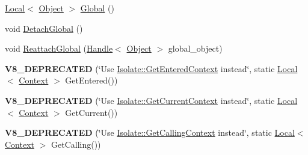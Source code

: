 \begin{DoxyCompactItemize}
\item 
\hyperlink{classv8_1_1_local}{Local}$<$ \hyperlink{classv8_1_1_object}{Object} $>$ \hyperlink{classv8_1_1_context_af5cd9f97ef6a3307c1c21f80f4b743eb}{Global} ()
\item 
void \hyperlink{classv8_1_1_context_a841c7dd92eb8c57df92a268a164dea97}{Detach\+Global} ()
\item 
void \hyperlink{classv8_1_1_context_a1db9a514d7bb1c055a26359727bd2f6b}{Reattach\+Global} (\hyperlink{classv8_1_1_handle}{Handle}$<$ \hyperlink{classv8_1_1_object}{Object} $>$ global\+\_\+object)
\item 
\hypertarget{classv8_1_1_context_a198d807b5f4edc6ec7d55d7f9605a48b}{}{\bfseries V8\+\_\+\+D\+E\+P\+R\+E\+C\+A\+T\+E\+D} (\char`\"{}Use \hyperlink{classv8_1_1_isolate_aff9eb2f5d199f8fcf59d9699194cd2e3}{Isolate\+::\+Get\+Entered\+Context} instead\char`\"{}, static \hyperlink{classv8_1_1_local}{Local}$<$ \hyperlink{classv8_1_1_context}{Context} $>$ Get\+Entered())\label{classv8_1_1_context_a198d807b5f4edc6ec7d55d7f9605a48b}

\item 
\hypertarget{classv8_1_1_context_a4223b32052c094d95de8b79690cc95b4}{}{\bfseries V8\+\_\+\+D\+E\+P\+R\+E\+C\+A\+T\+E\+D} (\char`\"{}Use \hyperlink{classv8_1_1_isolate_afa1b6cde5a7a7cfde87eaabc4ab34062}{Isolate\+::\+Get\+Current\+Context} instead\char`\"{}, static \hyperlink{classv8_1_1_local}{Local}$<$ \hyperlink{classv8_1_1_context}{Context} $>$ Get\+Current())\label{classv8_1_1_context_a4223b32052c094d95de8b79690cc95b4}

\item 
\hypertarget{classv8_1_1_context_a881867eb2d1d4b68214c0d24ebf0836d}{}{\bfseries V8\+\_\+\+D\+E\+P\+R\+E\+C\+A\+T\+E\+D} (\char`\"{}Use \hyperlink{classv8_1_1_isolate_a2fba719b7a022ece0b0bfe55f52b3138}{Isolate\+::\+Get\+Calling\+Context} instead\char`\"{}, static \hyperlink{classv8_1_1_local}{Local}$<$ \hyperlink{classv8_1_1_context}{Context} $>$ Get\+Calling())\label{classv8_1_1_context_a881867eb2d1d4b68214c0d24ebf0836d}


\end{DoxyCompactItemize}
